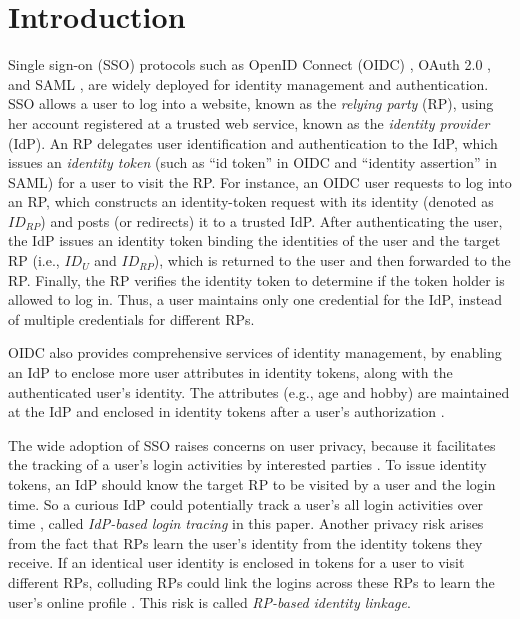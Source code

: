\section{Introduction}
\label{sec:intro}
Single sign-on (SSO) protocols such as OpenID Connect (OIDC) \cite{OpenIDConnect}, OAuth 2.0 \cite{rfc6749}, and SAML \cite{SAML, SAMLIdentifier}, are widely deployed for identity management and authentication.
SSO allows a user to log into a website,
 known as the \emph{relying party} (RP), using her account registered at a trusted web service, known as the \emph{identity provider} (IdP).
An RP delegates user identification and authentication to the IdP, which issues an \emph{identity token} (such as ``id token'' in OIDC and ``identity assertion'' in SAML) for a user to visit the RP.
For instance, an OIDC user requests to log into an RP,
which constructs an identity-token request with its identity (denoted as $ID_{RP}$) and posts (or redirects) it to a trusted IdP. After authenticating the user, the IdP issues an identity token binding the identities of the user and the target RP (i.e., $ID_U$ and $ID_{RP}$), which is returned to the user and then forwarded to the RP.
Finally, the RP verifies the identity token to determine if the token holder is allowed to log in. Thus, a user maintains only one credential for the IdP, instead of multiple credentials for different RPs.

OIDC also provides comprehensive services of identity management,
 by enabling an IdP to enclose more user attributes in identity tokens, along with the authenticated user's identity.
The attributes (e.g., age and hobby) are maintained at the IdP and enclosed in identity tokens after a user's authorization \cite{OpenIDConnect,rfc6749}.

The wide adoption of SSO raises concerns on user privacy, because it facilitates the tracking of a user's login activities by interested parties \cite{NIST2017draft, SPRESSO, BrowserID, maler2008venn}.
To issue identity tokens, an IdP should know the target RP to be visited by a user and the login time.
So a curious IdP could potentially track a user's all login activities over time
 \cite{BrowserID, SPRESSO},
called {\em IdP-based login tracing} in this paper.
Another privacy risk arises from the fact that RPs learn the user's identity from the identity tokens they receive.
If an identical user identity is enclosed in tokens for a user to visit different RPs, colluding RPs could link the logins across these RPs %
to learn the user's online profile \cite{maler2008venn, FirefoxAccount}.
This risk is called {\em RP-based identity linkage}. %


